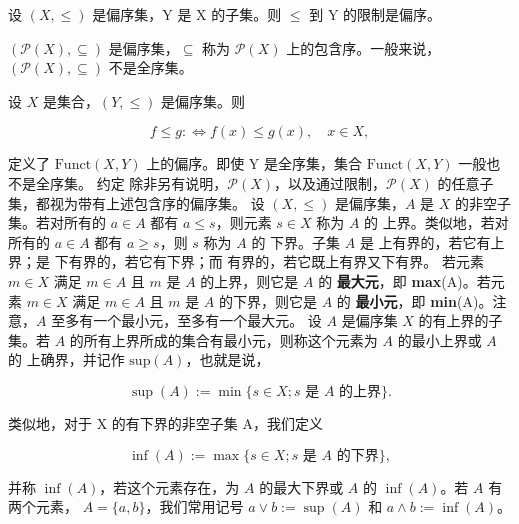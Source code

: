 \begin{example}

\begin{items}
\item

设  $ (X, \leq) $ 是偏序集，Y 是 X 的子集。则  $ \leq $ 到 Y 的限制是偏序。

\item

$ \left(\mathcal{P}(X),\subseteq\right) $ 是偏序集，$ \subseteq $ 称为  $ \mathcal{P}(X) $ 上的包含序。一般来说，$ \left(\mathcal{P}(X),\subseteq\right) $ 不是全序集。

\item

设 $X$ 是集合，$(Y, \leq)$ 是偏序集。则

\[
f\leq g:\Leftrightarrow f(x)\leq g(x),\quad x\in X,
\]

定义了  $ \mathrm{Funct}(X,Y) $ 上的偏序。即使 Y 是全序集，集合  $ \mathrm{Funct}(X,Y) $ 一般也不是全序集。
约定 除非另有说明，$ \mathcal{P}(X) $，以及通过限制，$ \mathcal{P}(X) $ 的任意子集，都视为带有上述包含序的偏序集。
设 $(X,\leq)$ 是偏序集，$A$ 是 $X$ 的非空子集。若对所有的 $a\in A$ 都有 $a\leq s$，则元素 $s\in X$ 称为 $A$ 的 $\text{上}\text{界}$。类似地，若对所有的 $a\in A$ 都有 $a\geq s$，则 $s$ 称为 $A$ 的 $\text{下}\text{界}$。子集 $A$ 是 $\text{上有界}$的，若它有上界；是 $\text{下有界}$的，若它有下界；而 $\text{有界}$的，若它既上有界又下有界。
若元素  $ m \in X $ 满足  $ m \in A $ 且  $ m $ 是  $ A $ 的上界，则它是  $ A $ 的 \textbf{最大元}，即 \textbf{max}(A)。若元素  $ m \in X $ 满足  $ m \in A $ 且  $ m $ 是  $ A $ 的下界，则它是  $ A $ 的 \textbf{最小元}，即 \textbf{min}(A)。注意，$ A $ 至多有一个最小元，至多有一个最大元。
设 $A$ 是偏序集 $X$ 的有上界的子集。若 $A$ 的所有上界所成的集合有最小元，则称这个元素为 $A$ 的最小上界或 $A$ 的 $\text{上确界}$，并记作 $\text{sup}(A)$，也就是说，

\[
\operatorname*{s u p}(A):=\operatorname*{m i n}\{s\in X;s\text{ 是 }A\text{ 的上界}\}.
\]

类似地，对于 X 的有下界的非空子集 A，我们定义

\[
\operatorname*{i n f}(A):=\operatorname*{m a x}\{s\in X;s\text{ 是 }A\text{ 的下界}\},
\]

并称  $ \inf(A) $，若这个元素存在，为  $ A $ 的最大下界或  $ A $ 的  $ \inf(A) $。若  $ A $ 有两个元素， $ A = \{a, b\} $，我们常用记号  $ a \vee b := \sup(A) $ 和  $ a \wedge b := \inf(A) $。

\end{items}

\end{example}

